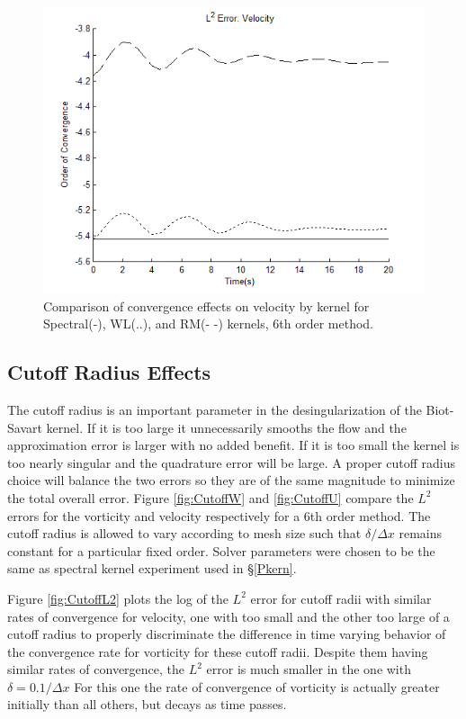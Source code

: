 \documentclass[letterpaper,12pt]{report}
\begin{document}
\begin{figure}
\centering
\includegraphics[width=1\textwidth]{KernU.PNG}
\caption{\label{fig:KernU}Comparison of convergence effects on velocity by kernel for Spectral(-), WL(..), and RM(- -) kernels, 6th order method.}
\end{figure}

%
\subsection{Cutoff Radius Effects}\label{Pcutoff}
The cutoff radius is an important parameter in the desingularization of the Biot-Savart kernel. If it is too large it unnecessarily smooths the flow and the approximation error is larger with no added benefit. If it is too small the kernel is too nearly singular and the quadrature error will be large. A proper cutoff radius choice will balance the two errors so they are of the same magnitude to minimize the total overall error. Figure \ref{fig:CutoffW} and \ref{fig:CutoffU} compare the $L^2$ errors for the vorticity and velocity respectively for a 6th order method. The cutoff radius is allowed to vary according to mesh size such that $\delta/\Delta x$ remains constant for a particular fixed order. Solver parameters were chosen to be the same as spectral kernel experiment used in \S \ref{Pkern}.

Figure \ref{fig:CutoffL2} plots the log of the $L^2$ error for cutoff radii with similar rates of convergence for velocity, one with too small and the other too large of a cutoff radius to properly discriminate the difference in time varying behavior of the convergence rate for vorticity for these cutoff radii. Despite them having similar rates of convergence, the $L^2$ error is much smaller in the one with $\delta=0.1/\Delta x$ For this one the rate of convergence of vorticity is actually greater initially than all others, but decays as time passes.
\end{document}
